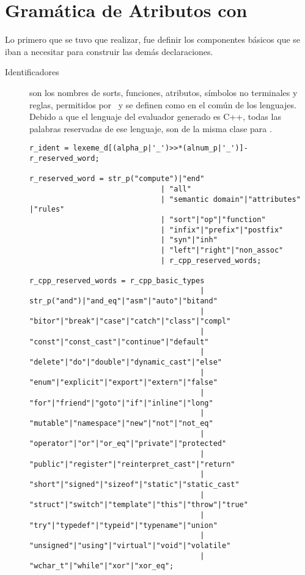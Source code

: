 \section{Gramática de Atributos con \spirit}
\label{sec:gramspirit}
Lo primero que se tuvo que realizar, fue definir los componentes básicos que se iban a necesitar para construir las demás declaraciones.

\begin{description}
\item [Identificadores] son los nombres de sorts, funciones, atributos, símbolos no terminales y reglas, permitidos por \maggen\ y se definen como en el común de los lenguajes. Debido a que el lenguaje del evaluador generado es C++, todas las palabras reservadas de ese lenguaje, son de la misma clase para \maggen.

\begin{lstlisting}[columns=fullflexible, linewidth=12.6cm]
r_ident = lexeme_d[(alpha_p|'_')>>*(alnum_p|'_')]-r_reserved_word;

r_reserved_word = str_p("compute")|"end"
                              | "all"
                              | "semantic domain"|"attributes" |"rules"
                              | "sort"|"op"|"function"
                              | "infix"|"prefix"|"postfix"
                              | "syn"|"inh"
                              | "left"|"right"|"non_assoc"
                              | r_cpp_reserved_words;

r_cpp_reserved_words = r_cpp_basic_types
                                       | str_p("and")|"and_eq"|"asm"|"auto"|"bitand"
                                       | "bitor"|"break"|"case"|"catch"|"class"|"compl"
                                       | "const"|"const_cast"|"continue"|"default"
                                       | "delete"|"do"|"double"|"dynamic_cast"|"else"
                                       | "enum"|"explicit"|"export"|"extern"|"false"
                                       | "for"|"friend"|"goto"|"if"|"inline"|"long"
                                       | "mutable"|"namespace"|"new"|"not"|"not_eq"
                                       | "operator"|"or"|"or_eq"|"private"|"protected"
                                       | "public"|"register"|"reinterpret_cast"|"return"
                                       | "short"|"signed"|"sizeof"|"static"|"static_cast"
                                       | "struct"|"switch"|"template"|"this"|"throw"|"true"
                                       | "try"|"typedef"|"typeid"|"typename"|"union"
                                       | "unsigned"|"using"|"virtual"|"void"|"volatile"
                                       | "wchar_t"|"while"|"xor"|"xor_eq";


\end{lstlisting}
\end{description}
